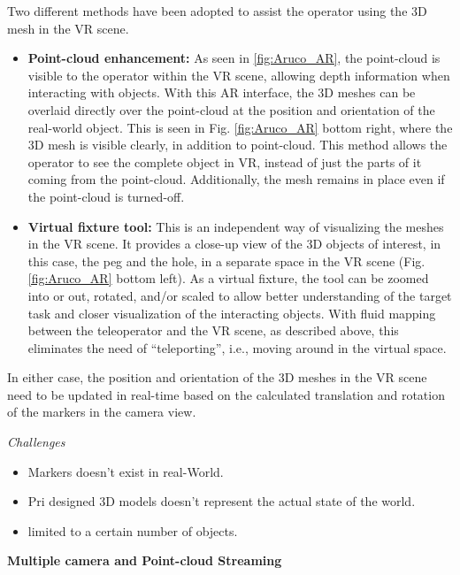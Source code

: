 Two different methods have been adopted to assist the operator using the 3D mesh in the VR scene.

\begin{itemize}
    \item \textbf{Point-cloud  enhancement:}  As  seen  in \ref{fig:Aruco_AR},  the  point-cloud  is  visible  to  the  operator  within the VR scene, allowing depth information when interacting with objects. With this AR interface,  the  3D  meshes  can  be  overlaid  directly  over  the  point-cloud at  the  position  and  orientation  of  the  real-world  object.  This  is  seen  in  Fig. \ref{fig:Aruco_AR} bottom right,  where  the  3D  mesh  is  visible  clearly, in addition to point-cloud. This method allows the operator to see the complete object in  VR,  instead  of  just  the  parts  of  it  coming  from  the  point-cloud.  Additionally,  the  mesh  remains in place even if the point-cloud is turned-off.
    
    \item \textbf{Virtual fixture tool:} This is an independent way of visualizing the meshes in the VR scene. It provides a close-up view of the 3D objects of interest, in   this case, the peg and the hole, in a separate space in the VR scene (Fig. \ref{fig:Aruco_AR} bottom left). As a virtual fixture, the tool can be zoomed into or out,  rotated,  and/or  scaled  to  allow  better  understanding  of  the  target  task  and  closer  visualization of the interacting objects. With fluid mapping between the teleoperator and the VR scene, as described above, this eliminates the need of “teleporting”, i.e., moving around in the virtual space.
    
\end{itemize}

In either case, the position and orientation of the 3D meshes in the VR scene need to be updated in real-time based on the calculated translation and rotation of the markers in the camera view.

\textit{Challenges}
\begin{itemize}
    \item Markers doesn't exist in real-World.
    \item Pri designed 3D models doesn't represent the actual state of the world.
    \item limited to a certain number of objects.
\end{itemize}


\textbf{Multiple camera and Point-cloud Streaming}

